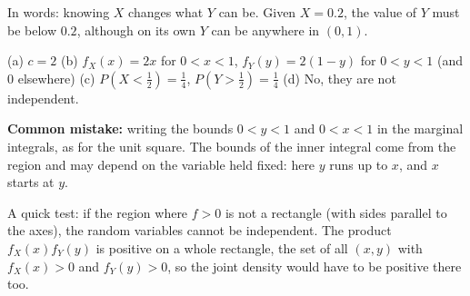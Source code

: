 \begin{solution}
	In words: knowing $X$ changes what $Y$ can be. Given $X=0.2$, the value of
	$Y$ must be below $0.2$, although on its own $Y$ can be anywhere in
	$(0,1)$.

	\begin{answer}
		(a) $c=2$ \quad
		(b) $f_X(x)=2x$ for $0<x<1$, $f_Y(y)=2(1-y)$ for $0<y<1$ (and $0$
		elsewhere) \quad
		(c) $P(X<\frac12)=\frac14$, $P(Y>\frac12)=\frac14$ \quad
		(d) No, they are not independent.
	\end{answer}
	\begin{remark}
		\textbf{Common mistake:} writing the bounds $0<y<1$ and $0<x<1$ in the
		marginal integrals, as for the unit square. The bounds of the inner
		integral come from the region and may depend on the variable held
		fixed: here $y$ runs up to $x$, and $x$ starts at $y$.

		A quick test: if the region where $f>0$ is not a rectangle (with sides
		parallel to the axes), the random variables cannot be independent. The
		product $f_X(x)f_Y(y)$ is positive on a whole rectangle, the set of all
		$(x,y)$ with $f_X(x)>0$ and $f_Y(y)>0$, so the joint density would have
		to be positive there too.
	\end{remark}
\end{solution}
